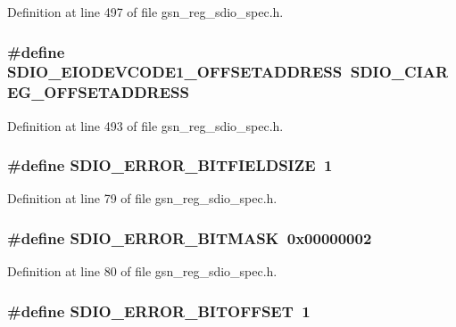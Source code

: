 Definition at line 497 of file gsn\_\-reg\_\-sdio\_\-spec.h.

\hypertarget{a00571_a94c07b17727ac60a9c42c64bcaa318d8}{
\subsubsection[{SDIO\_\-EIODEVCODE1\_\-OFFSETADDRESS}]{\setlength{\rightskip}{0pt plus 5cm}\#define SDIO\_\-EIODEVCODE1\_\-OFFSETADDRESS~SDIO\_\-CIAREG\_\-OFFSETADDRESS}}
\label{a00571_a94c07b17727ac60a9c42c64bcaa318d8}


Definition at line 493 of file gsn\_\-reg\_\-sdio\_\-spec.h.

\hypertarget{a00571_a03dde52df8626a459d4f571fb9215347}{
\subsubsection[{SDIO\_\-ERROR\_\-BITFIELDSIZE}]{\setlength{\rightskip}{0pt plus 5cm}\#define SDIO\_\-ERROR\_\-BITFIELDSIZE~1}}
\label{a00571_a03dde52df8626a459d4f571fb9215347}


Definition at line 79 of file gsn\_\-reg\_\-sdio\_\-spec.h.

\hypertarget{a00571_a1d636cba23572d3bd30712ea61c2d237}{
\subsubsection[{SDIO\_\-ERROR\_\-BITMASK}]{\setlength{\rightskip}{0pt plus 5cm}\#define SDIO\_\-ERROR\_\-BITMASK~0x00000002}}
\label{a00571_a1d636cba23572d3bd30712ea61c2d237}


Definition at line 80 of file gsn\_\-reg\_\-sdio\_\-spec.h.

\hypertarget{a00571_ad5f35da858a43e0f388c02aaa0ad1850}{
\subsubsection[{SDIO\_\-ERROR\_\-BITOFFSET}]{\setlength{\rightskip}{0pt plus 5cm}\#define SDIO\_\-ERROR\_\-BITOFFSET~1}}
\label{a00571_ad5f35da858a43e0f388c02aaa0ad1850}


